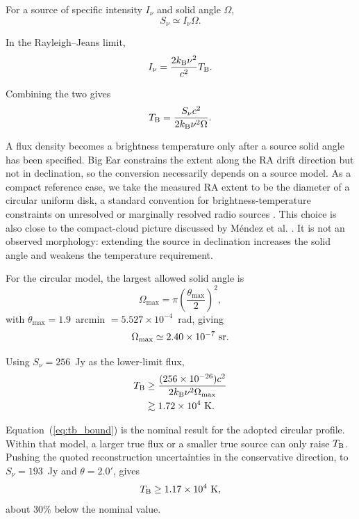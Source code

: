 \documentclass[crop]{CSL}
\newcommand{\tbeq}{T_{\rm B}}
\newcommand{\snu}{S_\nu}
\begin{document}
For a source of specific intensity $I_\nu$ and solid angle $\Omega$,
\begin{equation}
\snu\simeq I_\nu\Omega.
\end{equation}

In the Rayleigh--Jeans limit,
\begin{equation}
I_\nu=
\frac{2k_{\rm B}\nu^2}{c^2}\tbeq.
\end{equation}

Combining the two gives
\begin{equation}
\tbeq=
\frac{\snu c^2}
{2k_{\rm B}\nu^2\Omega}.
\label{eq:tb}
\end{equation}

A flux density becomes a brightness temperature only after a source solid angle has been specified. Big Ear constrains the extent along the RA drift direction but not in declination, so the conversion necessarily depends on a source model. As a compact reference case, we take the measured RA extent to be the diameter of a circular uniform disk, a standard convention for brightness-temperature constraints on unresolved or marginally resolved radio sources \citep{condon2016}. This choice is also close to the compact-cloud picture discussed by M\'endez et al. \citep{mendez2025}. It is not an observed morphology: extending the source in declination increases the solid angle and weakens the temperature requirement.

For the circular model, the largest allowed solid angle is
\begin{equation}
\Omega_{\max}
=
\pi\left(\frac{\theta_{\max}}{2}\right)^2,
\end{equation}
with $\theta_{\max}=1.9$~arcmin $=5.527\times10^{-4}$~rad, giving
\[
\Omega_{\max}\simeq2.40\times10^{-7}~{\rm sr}.
\]

Using $\snu=256$~Jy as the lower-limit flux,
\begin{align}
\tbeq
&\geq
\frac{(256\times10^{-26})c^2}
{2k_{\rm B}\nu^2\Omega_{\max}}
\nonumber\\
&\gtrsim
1.72\times10^4~{\rm K}.
\label{eq:tb_bound}
\end{align}

Equation~(\ref{eq:tb_bound}) is the nominal result for the adopted circular profile. Within that model, a larger true flux or a smaller true source can only raise $\tbeq$. Pushing the quoted reconstruction uncertainties in the conservative direction, to $\snu=193$~Jy and $\theta=2.0'$, gives
\[
\tbeq\geq1.17\times10^4~{\rm K},
\]
about 30\% below the nominal value.
\end{document}
